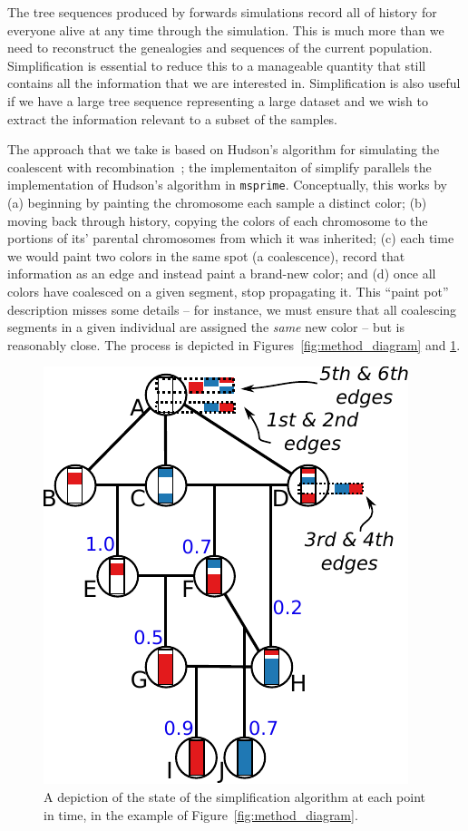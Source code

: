 \documentclass{article}
\newcommand{\msprime}{\texttt{msprime}}
\begin{document}
The tree sequences produced by forwards simulations
record all of history for everyone alive at any time through the simulation.
This is much more than we need to reconstruct the genealogies and sequences
of the current population.
Simplification is essential to reduce this
to a manageable quantity that still contains all
the information that we are interested in.
Simplification is also useful if we have a
large tree sequence representing a large dataset and we wish to extract the
information relevant to a subset of the samples.

The approach that we take is based on Hudson's algorithm for simulating
the coalescent with recombination~\citep{hudson1983properties,kelleher2016efficient};
the implementaiton of simplify parallels the implementation of Hudson's algorithm in \msprime.
Conceptually, this works by
(a) beginning by painting the chromosome each sample a distinct color;
(b) moving back through history,
copying the colors of each chromosome to the portions of its' parental chromosomes
from which it was inherited;
(c) each time we would paint two colors in the same spot (a coalescence),
record that information as an edge and instead paint a brand-new color;
and
(d) once all colors have coalesced on a given segment,
stop propagating it.
This ``paint pot'' description misses some details --
for instance, we must ensure that all coalescing segments in a given individual
are assigned the \emph{same} new color --
but is reasonably close.
The process is depicted in Figures~\ref{fig:method_diagram} and \ref{fig:simplify_state}.

\begin{figure}
    \begin{center}
        \includegraphics{simplify-state-diagram}
    \end{center}
    \caption{
        A depiction of the state of the simplification algorithm
        at each point in time,
        in the example of Figure~\ref{fig:method_diagram}.
        \label{fig:simplify_state}
    }
\end{figure}
\end{document}
